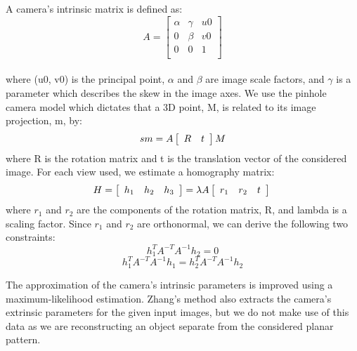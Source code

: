 A camera's intrinsic matrix is defined as:\\
\[
   A =
  \left[ {\begin{array}{ccc}
   \alpha & \gamma & u0  \\
   0 & \beta & v0 \\
   0 & 0 & 1 \\
  \end{array} } \right]
\] \\
where (u0, v0) is the principal point, $\alpha$ and $\beta$ are image scale factors, and $\gamma$ is a parameter which describes the skew in the image axes. We use the pinhole camera model which dictates that a 3D point, M, is related to its image projection, m, by:
\begin{equation}
  sm = A
  \left[ {\begin{array}{cc}
   R & t \\
  \end{array} } \right]
  M \\
\end{equation}
where R is the rotation matrix and t is the translation vector of the considered image. 
For each view used, we estimate a homography matrix:
\begin{equation}
  H =
  \left[ {\begin{array}{ccc}
   h_1 & h_2 & h_3 \\
  \end{array} } \right]
  = \lambda  A
  \left[ {\begin{array}{ccc}
   r_1 & r_2 & t \\
  \end{array} } \right]
  \\
\end{equation}
where $r_1$ and $r_2$ are the components of the rotation matrix, R, and lambda is a scaling factor.  Since $r_1$ and $r_2$ are orthonormal, we can derive the following two constraints:
\begin{equation}
  h_1^T A^{-T} A^{-1} h_2 = 0
\end{equation}
\begin{equation}
  h_1^T A^{-T} A^{-1} h_1 = h_2^T A^{-T} A^{-1} h_2
\end{equation}

The approximation of the camera's intrinsic parameters is improved using a maximum-likelihood estimation. Zhang's method also extracts the camera's extrinsic parameters for the given input images, but we do not make use of this data as we are reconstructing an object separate from the considered planar pattern. 
